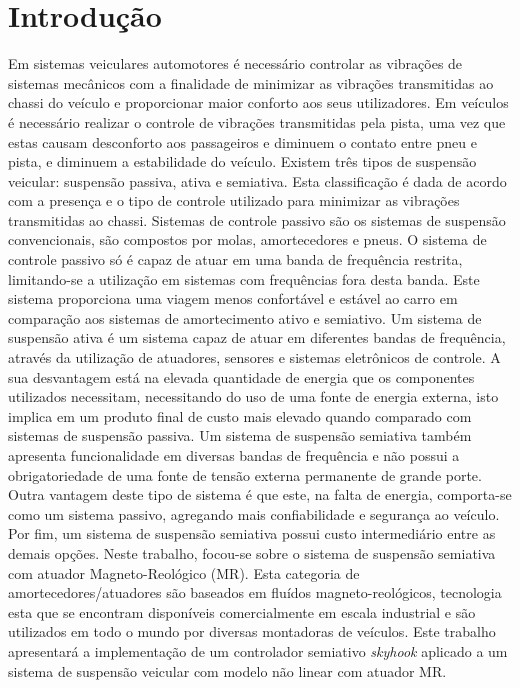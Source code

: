 \documentclass[a4paper]{ifacconf}
\begin{document}
    \section{Introdução}
    Em sistemas veiculares automotores é necessário controlar as vibrações de sistemas mecânicos com a finalidade de minimizar as vibrações transmitidas ao chassi do veículo e proporcionar maior conforto aos seus utilizadores.
    Em veículos é necessário realizar o controle de vibrações transmitidas pela pista, uma vez que estas causam desconforto aos passageiros e diminuem o contato entre pneu e pista, e diminuem a estabilidade do veículo.
    Existem três tipos de suspensão veicular: suspensão passiva, ativa e semiativa. Esta classificação é dada de acordo com a presença e o tipo de controle utilizado para minimizar as vibrações transmitidas ao chassi.
    Sistemas de controle passivo são os sistemas de suspensão convencionais, são compostos por molas, amortecedores e pneus. O sistema de controle passivo só é capaz de atuar em uma banda de frequência restrita, limitando-se a utilização em sistemas com frequências fora desta banda. Este sistema proporciona uma viagem menos confortável e estável ao carro em comparação aos sistemas de amortecimento ativo e semiativo.
    Um sistema de suspensão ativa é um sistema capaz de atuar em diferentes bandas de frequência, através da utilização de atuadores, sensores e sistemas eletrônicos de controle. A sua desvantagem está na elevada quantidade de energia que os componentes utilizados necessitam, necessitando do uso de uma fonte de energia externa, isto implica em um produto final de custo mais elevado quando comparado com sistemas de suspensão passiva.
    Um sistema de suspensão semiativa também apresenta funcionalidade em diversas bandas de frequência e não possui a obrigatoriedade de uma fonte de tensão externa permanente de grande porte. Outra vantagem deste tipo de sistema é que este, na falta de energia, comporta-se como um sistema passivo, agregando mais confiabilidade e segurança ao veículo. Por fim, um sistema de suspensão semiativa possui custo intermediário entre as demais opções.
    Neste trabalho, focou-se sobre o sistema de suspensão semiativa com atuador Magneto-Reológico (MR). Esta categoria de amortecedores/atuadores são baseados em fluídos magneto-reológicos, tecnologia esta que se encontram disponíveis comercialmente em escala industrial e são utilizados em todo o mundo por diversas montadoras de veículos.
    Este trabalho apresentará a implementação de um controlador semiativo \emph{skyhook} aplicado a um sistema de suspensão veicular com modelo não linear com atuador MR.
\end{document}
